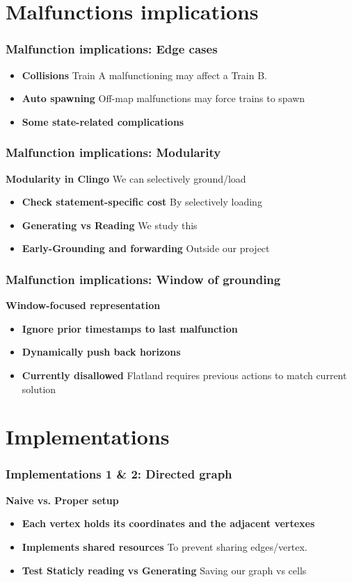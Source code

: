 \section{Malfunctions implications}

\begin{frame}
	\frametitle{Malfunction implications: Edge cases}
		\begin{itemize}
		\item \textbf{Collisions} Train A malfunctioning may affect a Train B.
		\item \textbf{Auto spawning}  Off-map malfunctions may force trains to spawn
		\item \textbf{Some state-related complications}  
	\end{itemize}
	
	
\end{frame}


\begin{frame}
	\frametitle{Malfunction implications: Modularity}
	\textbf{Modularity in Clingo} We can selectively ground/load
		\begin{itemize}
		\item \textbf{Check statement-specific cost}  By selectively loading
		\item \textbf{Generating vs Reading} We study this 
		\item \textbf{Early-Grounding and forwarding} Outside our project  
	\end{itemize}
\end{frame}


\begin{frame}
	\frametitle{Malfunction implications: Window of grounding}
		\textbf{Window-focused representation} 
	\begin{itemize}
		\item \textbf{Ignore prior timestamps to last malfunction} 
		\item \textbf{Dynamically push back horizons} 
		\item \textbf{Currently disallowed} Flatland requires previous actions to match current solution
		
	\end{itemize}
\end{frame}

\section{Implementations}

\begin{frame}
	\frametitle{Implementations 1 \& 2: Directed graph}
	\textbf{Naive vs. Proper setup} 
	\begin{itemize}
		\item \textbf{Each vertex holds its coordinates and the adjacent vertexes} 
		\item \textbf{Implements shared resources} To prevent sharing edges/vertex. 
		\item \textbf{Test Staticly reading vs Generating}  Saving our graph vs cells 		
	\end{itemize}
\end{frame}

